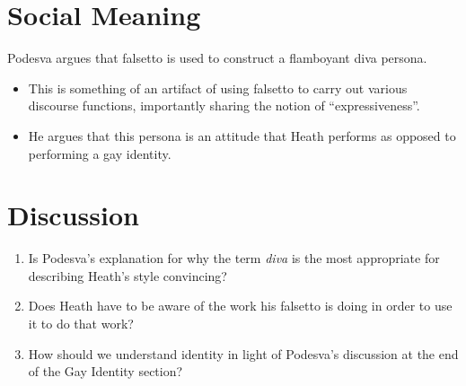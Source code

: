 \documentclass{article}
\newcommand{\lexi}[1]{\textit{#1}}
\begin{document}
  \section{Social Meaning}
    Podesva argues that falsetto is used to construct a flamboyant diva persona.
    \begin{itemize}
      \item This is something of an artifact of using falsetto to carry out various discourse functions, importantly sharing the notion of ``expressiveness''.
      \item He argues that this persona is an attitude that Heath performs as opposed to performing a gay identity.
    \end{itemize}
  \section{Discussion}
    \begin{enumerate}
      \item Is Podesva's explanation for why the term \lexi{diva} is the most appropriate for describing Heath's style convincing?
      \item Does Heath have to be aware of the work his falsetto is doing in order to use it to do that work?
      \item How should we understand identity in light of Podesva's discussion at the end of the Gay Identity section?
    \end{enumerate}
\end{document}
